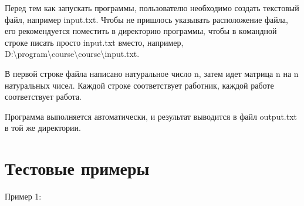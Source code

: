\documentclass[]{article}
\begin{document}
Перед тем как запускать программы, пользователю необходимо создать
текстовый файл, например input.txt. Чтобы не пришлось указывать
расположение файла, его рекомендуется поместить в директорию программы,
чтобы в командной строке писать просто input.txt вместо, например,  
D:\textbackslash program\textbackslash course\textbackslash course\textbackslash input.txt.

В первой строке файла написано натуральное число n, затем идет матрица n
на n натуральных чисел. Каждой строке соответствует работник, каждой
работе соответствует работа.

Программа выполняется автоматически, и результат выводится в файл
output.txt в той же директории.

\hypertarget{Тестовые примеры}{%
\section{\texorpdfstring{\textbf{Тестовые
примеры}}{Тестовые примеры}}\label{Тестовые примеры}}

Пример 1:
\end{document}
